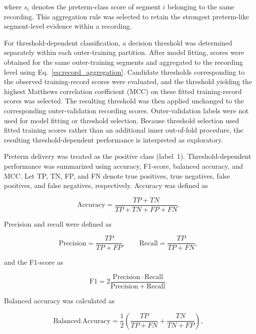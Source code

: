 \documentclass[10pt,letterpaper]{article}
\begin{document}
where $s_i$ denotes the preterm-class score of segment $i$ belonging to the same recording. This aggregation rule was selected to retain the strongest preterm-like segment-level evidence within a recording.

For threshold-dependent classification, a decision threshold was determined separately within each outer-training partition. After model fitting, scores were obtained for the same outer-training segments and aggregated to the recording level using Eq.~\ref{eq:record_aggregation}. Candidate thresholds corresponding to the observed training-record scores were evaluated, and the threshold yielding the highest Matthews correlation coefficient (MCC) on these fitted training-record scores was selected. The resulting threshold was then applied unchanged to the corresponding outer-validation recording scores. Outer-validation labels were not used for model fitting or threshold selection. Because threshold selection used fitted training scores rather than an additional inner out-of-fold procedure, the resulting threshold-dependent performance is interpreted as exploratory.

Preterm delivery was treated as the positive class (label~1). Threshold-dependent performance was summarized using accuracy, F1-score, balanced accuracy, and MCC. Let TP, TN, FP, and FN denote true positives, true negatives, false positives, and false negatives, respectively. Accuracy was defined as

\begin{equation}
\mathrm{Accuracy}
=
\frac{TP+TN}{TP+TN+FP+FN}.
\end{equation}

Precision and recall were defined as

\begin{equation}
\mathrm{Precision}
=
\frac{TP}{TP+FP},
\qquad
\mathrm{Recall}
=
\frac{TP}{TP+FN},
\end{equation}

and the F1-score as

\begin{equation}
\mathrm{F1}
=
2
\frac{\mathrm{Precision}\cdot\mathrm{Recall}}
{\mathrm{Precision}+\mathrm{Recall}}.
\end{equation}

Balanced accuracy was calculated as

\begin{equation}
\mathrm{Balanced\ Accuracy}
=
\frac{1}{2}
\left(
\frac{TP}{TP+FN}
+
\frac{TN}{TN+FP}
\right),
\end{equation}
\end{document}
